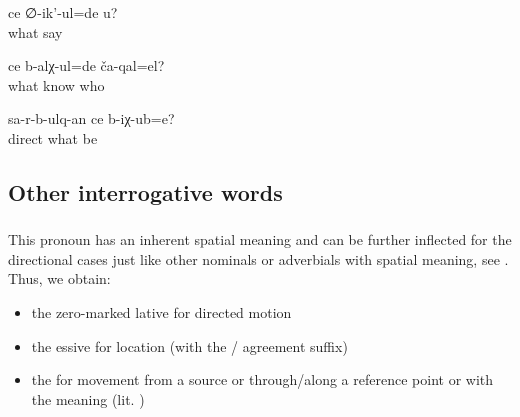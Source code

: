 \begin{exe}
	\ex	\label{ex:What do you (masc.) say}
	\gll	ce	∅-ik'-ul=de	u?\\
		what	say	\\
	\glt	{}

	\ex	\label{ex:How do you know who they are}
	\gll	ce	b-alχ-ul=de	ča-qal=el?\\
		what	know	who\\
	\glt	{}

	\ex	\label{ex:(The picture on which the people) run away, where is it}
	\gll	sa-r-b-ulq-an	ce	b-iχ-ub=e?\\
		direct	what	be\\
	\glt	{}
\end{exe}



\subsection{Other interrogative words}
\label{ssec:Other interrogative pronouns}



\subsubsection{ }\label{sssec:cina where}\largerpage

This pronoun has an inherent spatial meaning and can be further inflected for the directional cases just like other nominals or adverbials with spatial meaning, see . Thus, we obtain:

\begin{itemize}
	\item	the zero-marked lative  for directed motion 
	\item	the essive  for location (with the / agreement suffix) 
	\item	the   for movement from a source or through\slash along a reference point or with the meaning  (lit. ) 
\end{itemize}

